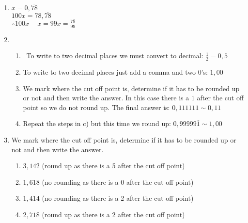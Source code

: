 \begin{eocsolutions}{}
{\begin{enumerate}[itemsep=6pt, label=\textbf{\arabic*}. ]

\item %
$x=0,\overline{78}$\\
$100x=78,\overline{78}$\\ 
$\therefore 100x-x=99x=\frac{78}{99}$
\item %
    \begin{enumerate}[noitemsep, label=\textbf{(\alph*)} ]  
    \item  To write to two decimal places we must convert to decimal: $\frac{1}{2}=0,5$%
    \item To write to two decimal places just add a comma and two $0$'s: $1,00$%
    \item We mark where the cut off point is, determine if it has to be rounded up or not and then write the answer. In this case there is a $1$ 
after the cut off point so we do not round up. The final answer is: $0,11111\overline{1} \sim 0,11$%
    \item Repeat the steps in c) but this time we round up: $0,99999\overline{1} \sim 1,00$%
    \end{enumerate}

\item %
We mark where the cut off point is, determine if it has to be rounded up or not and then write the answer. 
    \begin{enumerate}[noitemsep, label=\textbf{(\alph*)} ] 
\item $3,142$ (round up as there is a 5 after the cut off point) 
\item $1,618$ (no rounding as there is a 0 after the cut off point) 
\item $1,414$ (no rounding as there is a 2 after the cut off point) 
\item $2,718$ (round up as there is a 2 after the cut off point) 
    \end{enumerate}


\end{enumerate}}
\end{eocsolutions}
